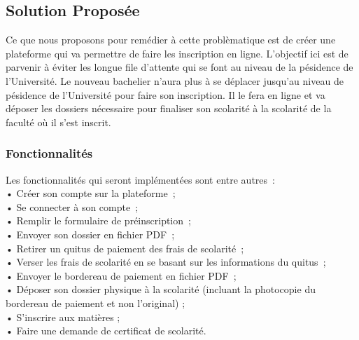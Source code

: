 \documentclass[12pt,a4paper]{article}
\begin{document}
	\subsection{Solution Proposée}
	Ce que nous proposons pour remédier à cette problèmatique est de créer une plateforme qui va permettre de faire les inscription en ligne. L’objectif ici est de parvenir à éviter les longue file d’attente qui se font au niveau de la pésidence de l'Université. Le nouveau bachelier n’aura plus à se déplacer jusqu’au niveau de pésidence de l'Université pour faire son inscription. Il le fera en ligne et va déposer les dossiers nécessaire pour finaliser son scolarité à la scolarité de la faculté où il s’est inscrit.
	
	\subsubsection{Fonctionnalités}
	Les fonctionnalités qui seront implémentées sont entre autres : \\
	• Créer son compte sur la plateforme ;\\
	• Se connecter à son compte ;\\
	• Remplir le formulaire de préinscription ;\\
	• Envoyer son dossier en fichier PDF ;\\
	• Retirer un quitus de paiement des frais de scolarité ;\\
	• Verser les frais de scolarité en se basant sur les informations du quitus ;\\
	• Envoyer le bordereau de paiement en fichier PDF ;\\
	• Déposer son dossier physique à la scolarité (incluant la photocopie du bordereau de paiement et non l’original) ;\\
	• S’inscrire aux matières ;\\
	• Faire une demande de certificat de scolarité.\\
		
	
\end{document}
